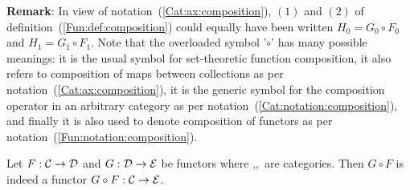 \noindent
{\bf Remark}: In view of notation~(\ref{Cat:ax:composition}), $(1)$ and $(2)$ of
definition~(\ref{Fun:def:composition}) could equally have been written
$H_{0}=G_{0}\circ F_{0}$ and $H_{1}=G_{1}\circ F_{1}$. Note that the overloaded
symbol '$\circ$' has many possible meanings: it is the usual symbol for
set-theoretic function composition, it also refers to composition of maps
between collections as per notation~(\ref{Cat:ax:composition}), it is the 
generic symbol for the composition operator in an arbitrary category as
per notation~(\ref{Cat:notation:composition}), and finally it is also used to
denote composition of functors as per notation~(\ref{Fun:notation:composition}).
\begin{prop}\label{Fun:prop:composition}
    Let $F:\mbox{$\cal C$}\to\mbox{$\cal D$}$ and $G:\mbox{$\cal D$}\to\mbox{$\cal E$}$ be functors where \Cat,\Dat,\Eat\ 
    are categories. Then $G\circ F$ is indeed a functor $G\circ F:\mbox{$\cal C$}\to\mbox{$\cal E$}$.
\end{prop}
